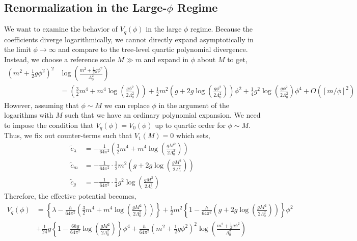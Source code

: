 \documentclass[12pt]{article}
\begin{document}
\subsection{Renormalization in the Large-$\phi$ Regime}

We want to examine the behavior of $V_q(\phi)$ in the large $\phi$ regime. Because the coefficients diverge logarithmically, we cannot directly expand asymptotically in the limit $\phi \to \infty$ and compare to the tree-level quartic polynomial divergence. Instead, we choose a reference scale $M \gg m$ and expand in $\phi$ about $M$ to get,
\begin{align*}
\left(m^2 + \tfrac{1}{2}  g \phi^2 \right)^2 & \log{\left( \frac{m^2 + \tfrac{1}{2} g \phi^2 }{\Lambda_0^2}  \right)} 
\\
& = \left( \frac{3}{2} m^4 + m^4 \log{\left( \frac{g \phi^2}{2 \Lambda_0^2} \right)} \right) + \frac{1}{2} m^2 \left( g + 2 g \log{\left( \frac{g \phi^2}{2 \Lambda_0^2} \right)} \right) \phi^2 + \frac{1}{4} g^2 \log{\left( \frac{g \phi^2}{2 \Lambda_0^2} \right)} \phi^4 + O([m/\phi]^2)
\end{align*}
However, assuming that $\phi \sim M$ we can replace $\phi$ in the argument of the logarithms with $M$ such that we have an ordinary polynomial expansion. We need to impose the condition that $V_q(\phi) = V_0(\phi)$ up to quartic order for $\phi \sim M$. Thus, we fix out counter-terms such that $V_1(M) = 0$ which sets,
\begin{align*}
\tilde{c}_{\lambda} & = - \frac{1}{64 \pi^2} \left( \frac{3}{2} m^4 + m^4 \log{\left( \frac{g M^2}{2 \Lambda_0^2} \right)} \right)
\\
\tilde{c}_m & = - \frac{1}{64\pi^2} \cdot \frac{1}{2} m^2 \left( g + 2 g \log{\left( \frac{g M^2}{2 \Lambda_0^2} \right)} \right)
\\
\tilde{c}_g & = - \frac{1}{64 \pi^2} \cdot \frac{1}{4} g^2 \log{\left( \frac{g M^2}{2 \Lambda_0^2} \right)}
\end{align*}
Therefore, the effective potential becomes,
\begin{align*}
V_q(\phi) & = \left\{ \lambda - \frac{\hbar}{64 \pi^2} \left( \frac{3}{2} m^4 + m^4 \log{\left( \frac{g M^2}{2 \Lambda_0^2} \right)} \right) \right\} + \frac{1}{2} m^2 \left\{ 1 - \frac{\hbar}{64\pi^2} \left( g + 2 g \log{\left( \frac{g M^2}{2 \Lambda_0^2} \right)} \right) \right\} \phi^2 
\\
& + \frac{1}{24} g \left\{1 -  \frac{6 \hbar g}{64 \pi^2} \log{\left( \frac{g M^2}{2 \Lambda_0^2} \right)} \right\} \phi^4 
+ \frac{\hbar}{64 \pi^2} \left(m^2 + \tfrac{1}{2}  g \phi^2 \right)^2  \log{\left( \frac{m^2 + \tfrac{1}{2} g \phi^2 }{\Lambda_0^2}  \right)} 
\end{align*}
\end{document}
